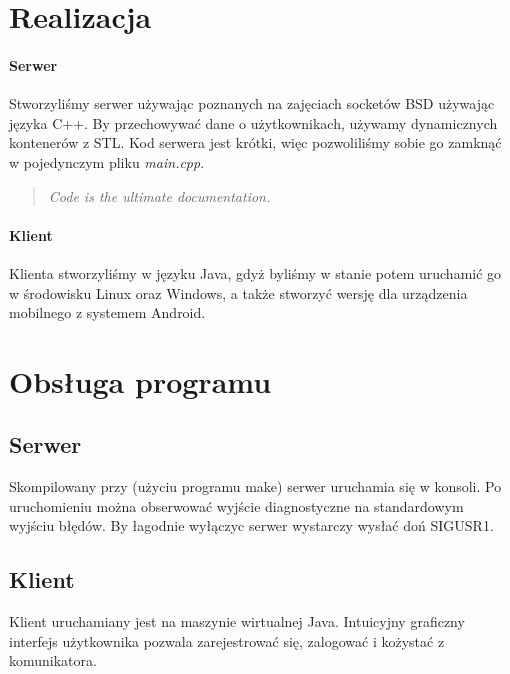 \documentclass[10pt,a4paper]{article}
\begin{document}
\section{Realizacja}
	\paragraph{Serwer}Stworzyliśmy serwer używając poznanych na zajęciach socketów BSD używając języka C++.
	By przechowywać dane o użytkownikach, używamy dynamicznych kontenerów z STL.
	Kod serwera jest krótki, więc pozwoliliśmy sobie go zamknąć w pojedynczym pliku \textit{main.cpp}.
	\begin{quote}
		\textit{Code is the ultimate documentation.}
	\end{quote}
	
	\paragraph{Klient}Klienta stworzyliśmy w języku Java, gdyż byliśmy w stanie potem uruchamić go w środowisku
	Linux oraz Windows, a także stworzyć wersję dla urządzenia mobilnego z systemem Android.
	
\section{Obsługa programu}
	\subsection{Serwer}
		Skompilowany przy (użyciu programu make) serwer uruchamia się w konsoli.
		Po uruchomieniu można obserwować wyjście diagnostyczne na standardowym wyjściu błędów.
		By łagodnie wyłączyc serwer wystarczy wysłać doń SIGUSR1.
	\subsection{Klient}
		Klient uruchamiany jest na maszynie wirtualnej Java.
		Intuicyjny graficzny interfejs użytkownika pozwala zarejestrować się, zalogować i kożystać z komunikatora.
\end{document}
